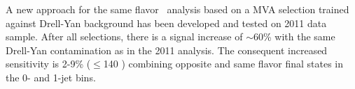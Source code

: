 A new approach for the same flavor \hww\ analysis based on a MVA selection trained against Drell-Yan background has been developed and tested on 2011 data sample.
After all selections, there is a signal increase of $\sim$60\% with the same Drell-Yan contamination as in the 2011 analysis. 
The consequent increased sensitivity is 2-9\% (\mHi$\leq$140 \GeVcc) combining opposite and same flavor final states in the 0- and 1-jet bins.
